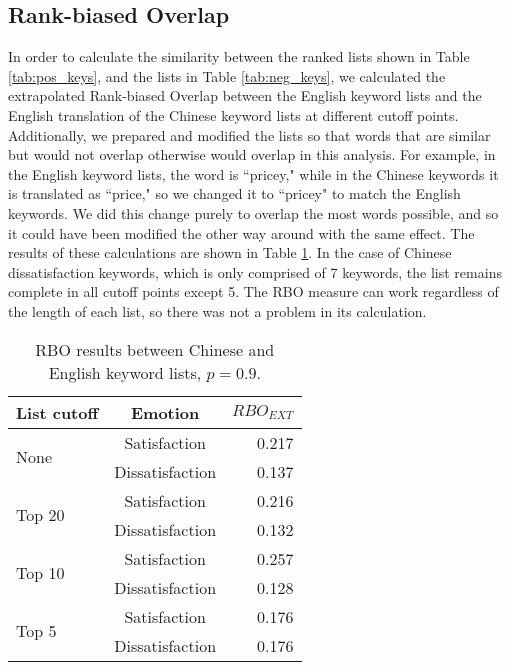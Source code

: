 \documentclass[smallextended,natbib]{svjour3}       %
\begin{document}
\subsection{Rank-biased Overlap}\label{rboresults}

In order to calculate the similarity between the ranked lists shown in Table \ref{tab:pos_keys}, and the lists in Table \ref{tab:neg_keys}, we calculated the extrapolated Rank-biased Overlap between the English keyword lists and the English translation of the Chinese keyword lists at different cutoff points. Additionally, we prepared and modified the lists so that words that are similar but would not overlap otherwise would overlap in this analysis. For example, in the English keyword lists, the word is ``pricey," while in the Chinese keywords it is translated as ``price," so we changed it to ``pricey" to match the English keywords. We did this change purely to overlap the most words possible, and so it could have been modified the other way around with the same effect. The results of these calculations are shown in Table \ref{tab:rbo}. In the case of Chinese dissatisfaction keywords, which is only comprised of 7 keywords, the list remains complete in all cutoff points except 5. The RBO measure can work regardless of the length of each list, so there was not a problem in its calculation.

\begin{table}[h]
\centering
\caption{RBO results between Chinese and English keyword lists, \(p=0.9\).}
\label{tab:rbo}
\begin{tabular}{|l|c|r|}
\hline
\multicolumn{1}{|c|}{\textbf{List cutoff}} & \textbf{Emotion} & \(RBO_{EXT}\) \\ \hline
\multirow{2}{*}{None}   & Satisfaction      & 0.217 \\ \cline{2-3} 
                        & Dissatisfaction   & 0.137 \\ \hline
\multirow{2}{*}{Top 20} & Satisfaction      & 0.216 \\ \cline{2-3} 
                        & Dissatisfaction   & 0.132 \\ \hline
\multirow{2}{*}{Top 10} & Satisfaction      & 0.257 \\ \cline{2-3} 
                        & Dissatisfaction   & 0.128 \\ \hline
\multirow{2}{*}{Top 5}  & Satisfaction      & 0.176 \\ \cline{2-3} 
                        & Dissatisfaction   & 0.176 \\ \hline
\end{tabular}
\end{table}
\end{document}

